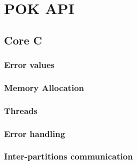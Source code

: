 %
% 
%
%
%
%
%


\chapter{POK API}
   \label{chapter-api}

   \section{Core C}

   \subsection{Error values}
      

   \subsection{Memory Allocation}
      

   \subsection{Threads}
      

   \subsection{Error handling}
      

   \subsection{Inter-partitions communication}

      

